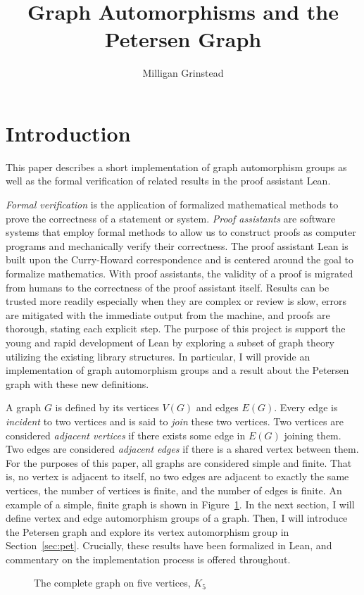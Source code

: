 \documentclass{article}
\title{Graph Automorphisms and the Petersen Graph}
\author{Milligan Grinstead}
\date{}
\begin{document}
\maketitle

\section{Introduction}
This paper describes a short implementation of graph automorphism groups as well as the formal verification of related results in the proof assistant Lean.

\textit{Formal verification} is the application of formalized mathematical methods to prove the correctness of a statement or system. \textit{Proof assistants} are software systems that employ formal methods to allow us to construct proofs as computer programs and mechanically verify their correctness. The proof assistant Lean is built upon the Curry-Howard correspondence and is centered around the goal to formalize mathematics. With proof assistants, the validity of a proof is migrated from humans to the correctness of the proof assistant itself. Results can be trusted more readily especially when they are complex or review is slow, errors are mitigated with the immediate output from the machine, and proofs are thorough, stating each explicit step. The purpose of this project is support the young and rapid development of Lean by exploring a subset of graph theory utilizing the existing library structures. In particular, I will provide an implementation of graph automorphism groups and a result about the Petersen graph with these new definitions.

A graph $G$ is defined by its vertices $V(G)$ and edges $E(G).$ Every edge is \textit{incident} to two vertices and is said to \textit{join} these two vertices. Two vertices are considered \textit{adjacent vertices} if there exists some edge in $E(G)$ joining them. Two edges are considered \textit{adjacent edges} if there is a shared vertex between them. For the purposes of this paper, all graphs are considered simple and finite. That is, no vertex is adjacent to itself, no two edges are adjacent to exactly the same vertices, the number of vertices is finite, and the number of edges is finite. An example of a simple, finite graph is shown in Figure~\ref{fig:k5}. In the next section, I will define vertex and edge automorphism groups of a graph. Then, I will introduce the Petersen graph and explore its vertex automorphism group in Section~\ref{sec:pet}. Crucially, these results have been formalized in Lean, and commentary on the implementation process is offered throughout.
\begin{figure}
    \centering
    
    \caption{The complete graph on five vertices, $K_5$}
    \label{fig:k5}
\end{figure}
\end{document}
